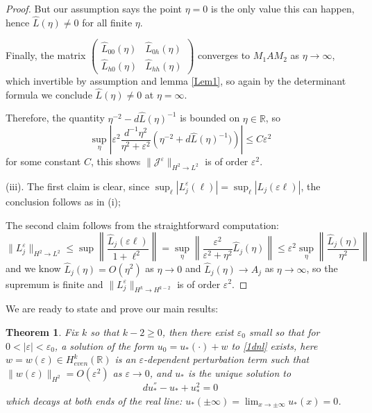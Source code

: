 \documentclass[letterpaper,11pt]{article}
\newcommand{\R}{\mathbb{R}}
\newcommand{\eps}{\varepsilon}
\numberwithin{equation}{section}
\theoremstyle{plain}
\newtheorem{theorem}{Theorem}[section]
\begin{document}
\begin{proof}
But our assumption says the point $\eta = 0$ is the only value this can happen, hence $\widehat{L}(\eta) \neq 0$ for all finite $\eta$.

Finally, the matrix $\begin{pmatrix}
\widehat{L}_{00}(\eta) &  \widehat{L}_{0h}(\eta) \\
\widehat{L}_{h0}(\eta) & \widehat{L}_{hh}(\eta)
\end{pmatrix}$ converges to $M_1AM_2$ as $\eta \to \infty$, which invertible by assumption and lemma \ref{Lem1}, so again by the determinant formula we conclude $\widehat{L}(\eta) \neq 0$ at $\eta  = \infty$.


Therefore, the quantity $\eta^{-2}-d\widehat{L}(\eta)^{-1}$ is bounded on $\eta \in \R$, so
\[
 \sup_{\eta}\left| \eps^2 \frac{d^{-1}\eta^2}{\eta^2+\eps^2}\left(\eta^{-2}+d\widehat{L}(\eta)^{-1})\right)\right| \le C \eps^2
\]
for some constant $C$, this shows $\|\mathcal{J}^{\eps}\|_{H^2 \to L^2}$ is of order $\eps^2$.


(iii). The first  claim is clear, since $\sup_{\ell}|L_{j}^{\eps}(\ell)|=\sup_{\ell}|L_j(\eps\ell)|$, the conclusion follows as in (i);

The second claim follows from the straightforward computation:
\[
\|L_{j}^{\eps}\|_{H^2 \to L^{2}} \le \sup \left\|\frac{\widehat{L}_j(\eps\ell)}{1+\ell^2}\right\|=\sup_{\eta}\left\| \frac{\eps^2}{\eps^2+\eta^2}\widehat{L}_j(\eta)\right\| \le \eps^2 \sup_{\eta}\left\|\frac{\widehat{L}_j(\eta)}{\eta^2}\right\|
\]
and we know $\widehat{L}_j(\eta)= O(\eta^2)$ as $\eta \to 0$ and $\widehat{L}_j(\eta) \to A_j$ as $\eta \to \infty$, so the supremum is finite and $\|L_{j}^{\eps}\|_{H^k\to H^{k-2}}$ is of order $\eps^2$.
\end{proof}


We are ready to state and prove our main results:
\begin{theorem}Fix $k$ so that $k-2\ge 0$,
then there exist $\eps_0$ small so that for $0<|\eps|<\eps_0$,  a solution of the form $u_0 = u_*(\cdot)+w$ to  \eqref{1dnl} exists, here $w=w(\eps) \in H^k_{even}(\R)$ is an $\eps$-dependent perturbation term such that $\|w(\eps)\|_{H^2} = O(\eps^2)$ as $\eps \to 0$, and $u_*$ is the unique solution to
\[
du_*^{''} - u_* +u_*^2 = 0
\]
which decays at both ends of the real line: $u_*(\pm \infty) = \lim_{x \to \pm \infty} u_*(x) = 0$.
\end{theorem}
\end{document}
